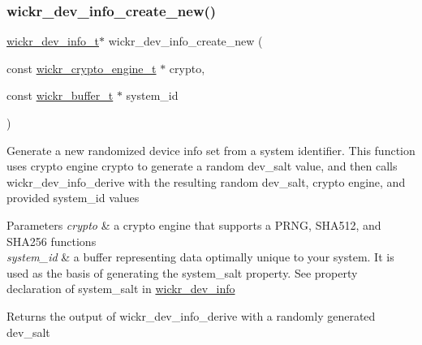 \subsubsection{\texorpdfstring{wickr\+\_\+dev\+\_\+info\+\_\+create\+\_\+new()}{wickr\_dev\_info\_create\_new()}}
{\footnotesize\ttfamily \mbox{\hyperlink{structwickr__dev__info}{wickr\+\_\+dev\+\_\+info\+\_\+t}}$\ast$ wickr\+\_\+dev\+\_\+info\+\_\+create\+\_\+new (\begin{DoxyParamCaption}\item[{const \mbox{\hyperlink{structwickr__crypto__engine}{wickr\+\_\+crypto\+\_\+engine\+\_\+t}} $\ast$}]{crypto,  }\item[{const \mbox{\hyperlink{structwickr__buffer}{wickr\+\_\+buffer\+\_\+t}} $\ast$}]{system\+\_\+id }\end{DoxyParamCaption})}

Generate a new randomized device info set from a system identifier. This function uses crypto engine \textquotesingle{}crypto\textquotesingle{} to generate a random \textquotesingle{}dev\+\_\+salt\textquotesingle{} value, and then calls \textquotesingle{}wickr\+\_\+dev\+\_\+info\+\_\+derive\textquotesingle{} with the resulting random \textquotesingle{}dev\+\_\+salt\textquotesingle{}, crypto engine, and provided \textquotesingle{}system\+\_\+id\textquotesingle{} values


\begin{DoxyParams}{Parameters}
{\em crypto} & a crypto engine that supports a P\+R\+NG, S\+H\+A512, and S\+H\+A256 functions \\
\hline
{\em system\+\_\+id} & a buffer representing data optimally unique to your system. It is used as the basis of generating the \textquotesingle{}system\+\_\+salt\textquotesingle{} property. See property declaration of \textquotesingle{}system\+\_\+salt\textquotesingle{} in \textquotesingle{}\mbox{\hyperlink{structwickr__dev__info}{wickr\+\_\+dev\+\_\+info}}\textquotesingle{} \\
\hline
\end{DoxyParams}
\begin{DoxyReturn}{Returns}
the output of \textquotesingle{}wickr\+\_\+dev\+\_\+info\+\_\+derive\textquotesingle{} with a randomly generated \textquotesingle{}dev\+\_\+salt\textquotesingle{} 
\end{DoxyReturn}
\mbox{\label{group__wickr__dev__info_ga7f81b96fc222560762d608772b3f44bd}} 
